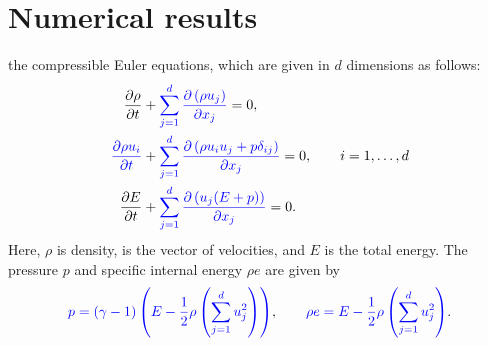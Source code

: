 \documentclass[review,onefignum,onetabnum,final]{siamart171218}
\newcommand{\pd}[2]{\frac{\partial#1}{\partial#2}}
\newcommand{\LRp}[1]{\left( #1 \right)}
\newcommand{\LRb}[1]{\left| #1 \right|}
\newcommand{\note}[1]{{\color{blue}{#1}}}
\begin{document}
\section{Numerical results}
\label{sec:3}

\note{In this section, we present numerical examples for} the compressible Euler equations, which are given in $d$ dimensions as follows:
\begin{align*}
\pd{\rho}{t} &+ \note{\sum_{j=1}^d \pd{\LRp{\rho {u}_j}}{x_j}} = 0,\\
\note{\pd{\rho {u}_i}{t}} &+ \note{\sum_{j=1}^d \pd{\LRp{\rho u_iu_j + p\delta_{ij} }}{x_j}} = 0, \qquad i = 1,\ldots,d\\
\pd{E}{t} &+ \note{\sum_{j=1}^d \pd{\LRp{{u}_j(E+p)}}{x_j}} = 0.\nonumber
\end{align*}
Here, $\rho$ is density, \note{$\LRp{{u}_1, \ldots,{u}_d}$} is the vector of velocities, and $E$ is the total energy.  The pressure $p$ and specific internal energy $\rho e$ are given by 
\[
\note{p = (\gamma-1)\LRp{E - \frac{1}{2}\rho \LRp{\sum_{j=1}^d u_j^2}}}, \qquad \note{\rho e = E - \frac{1}{2}\rho \LRp{\sum_{j=1}^d u_j^2}}. %
\]
\end{document}
